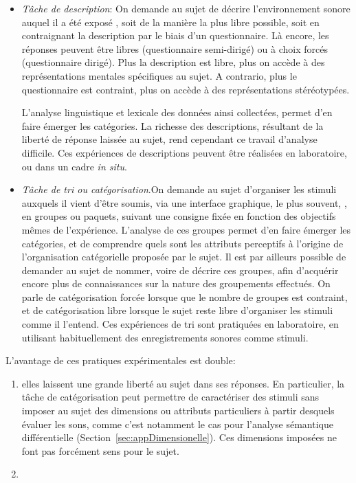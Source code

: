 \begin{itemize}
\item \emph{Tâche de description}: On demande au sujet de décrire l'environnement sonore auquel il a été exposé \citep{axelsson2005soundscape,raimbault2005urban,guastavino2006ideal,raimbault2006qualitative}, soit de la manière la plus libre possible, soit en contraignant la description par le biais d'un questionnaire. Là encore, les réponses peuvent être libres (questionnaire semi-dirigé) ou à choix forcés (questionnaire dirigé). Plus la description est libre, plus on accède à des représentations mentales spécifiques au sujet. A contrario, plus le questionnaire est contraint, plus on accède à des représentations stéréotypées. 

L'analyse linguistique et lexicale des données ainsi collectées, permet d'en faire émerger les catégories. La richesse des descriptions, résultant de la liberté de réponse laissée au sujet, rend cependant ce travail d'analyse difficile. Ces expériences de descriptions peuvent être réalisées en laboratoire, ou dans un cadre \emph{in situ}.

\item \emph{Tâche de tri ou catégorisation}.On demande au sujet d'organiser les stimuli auxquels il vient d'être soumis, via une interface graphique, le plus souvent, \citep{maffiolo_caracterisation_1999,guastavino2007categorization}, en groupes ou paquets, suivant une consigne fixée en fonction des objectifs mêmes de l'expérience. L'analyse de ces groupes permet d'en faire émerger les catégories, et de comprendre quels sont les attributs perceptifs à l'origine de l'organisation catégorielle proposée par le sujet. Il est par ailleurs possible de demander au sujet de nommer, voire de décrire ces groupes, afin d'acquérir encore plus de connaissances sur la nature des groupements effectués. On parle de catégorisation forcée lorsque que le nombre de groupes est contraint, et de catégorisation libre lorsque le sujet reste libre d'organiser les stimuli comme il l'entend. Ces expériences de tri sont pratiquées en laboratoire, en utilisant habituellement des enregistrements sonores comme stimuli.
\end{itemize}

L'avantage de ces pratiques expérimentales est double:

\begin{enumerate}

\item  elles laissent une grande liberté au sujet dans ses réponses. En particulier, la tâche de catégorisation peut permettre de caractériser des stimuli sans imposer au sujet des dimensions ou attributs particuliers à partir desquels évaluer les sons, comme c'est notamment le cas pour l'analyse sémantique différentielle (\Cf Section~\ref{sec:appDimensionelle}). Ces dimensions imposées ne font pas forcément sens pour le sujet. 

\item {}

\end{enumerate}

